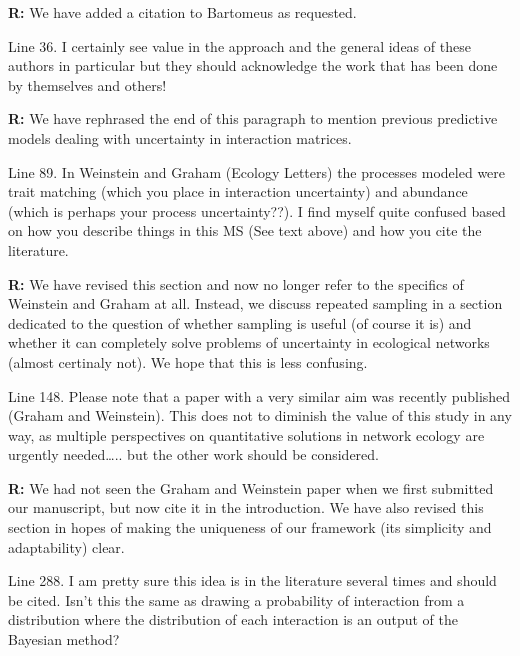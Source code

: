 \documentclass[12pt]{letter}
\newenvironment{refquote}{\bigskip \begin{it}}{\end{it}\smallskip}
\begin{document}
\begin{itemize}
			\textbf{R:} We have added a citation to Bartomeus as requested.

		\begin{refquote}
			Line 36.  I certainly see value in the approach and the general ideas of these authors in particular but they should acknowledge the work that has been done by themselves and others!\\
		\end{refquote}

		\textbf{R:} We have rephrased the end of this paragraph to mention previous predictive models dealing with uncertainty in interaction matrices.

		\begin{refquote}
		Line 89.  In Weinstein and Graham (Ecology Letters) the processes modeled were trait matching (which you place in interaction uncertainty) and abundance (which is perhaps your process uncertainty??).  I find myself quite confused based on how you describe things in this MS (See text above) and how you cite the literature.
		\end{refquote}

		\textbf{R:} We have revised this section and now no longer refer to the specifics of Weinstein and Graham at all. Instead, we discuss repeated sampling in a section dedicated to the question of whether sampling is useful (of course it is) and whether it can completely solve problems of uncertainty in ecological networks (almost certinaly not). We hope that this is less confusing.

		\begin{refquote}
		Line 148.  Please note that a paper with a very similar aim was recently published (Graham and Weinstein).  This does not to diminish the value of this study in any way, as multiple perspectives on quantitative solutions in network ecology are urgently needed….. but the other work should be considered. 
		\end{refquote}

		\textbf{R:} We had not seen the Graham and Weinstein paper when we first submitted our manuscript, but now cite it in the introduction. We have also revised this section in hopes of making the uniqueness of our framework (its simplicity and adaptability) clear. 

		\begin{refquote}
		Line 288.  I am pretty sure this idea is in the literature several times and should be cited.  Isn’t this the same as drawing a probability of interaction from a distribution where the distribution of each interaction is an output of the Bayesian method?\\
		\end{refquote}


\end{itemize}
\end{document}
